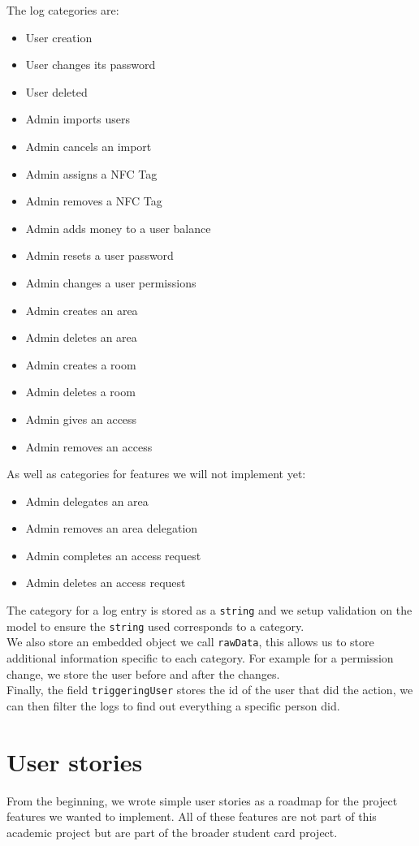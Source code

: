 \documentclass[11pt,a4paper]{report}
\begin{document}
The log categories are:
\begin{itemize}
\item User creation
\item User changes its password
\item User deleted
\item Admin imports users
\item Admin cancels an import
\item Admin assigns a NFC Tag
\item Admin removes a NFC Tag
\item Admin adds money to a user balance
\item Admin resets a user password
\item Admin changes a user permissions
\item Admin creates an area
\item Admin deletes an area
\item Admin creates a room
\item Admin deletes a room
\item Admin gives an access
\item Admin removes an access
\end{itemize}
As well as categories for features we will not implement yet:
\begin{itemize}
\item Admin delegates an area
\item Admin removes an area delegation
\item Admin completes an access request
\item Admin deletes an access request
\end{itemize}

The category for a log entry is stored as a \verb+string+ and we setup validation on the model to ensure the \verb+string+ used corresponds to a category.\\

We also store an embedded object we call \verb+rawData+, this allows us to store additional information specific to each category. For example for a permission change, we store the user before and after the changes. \\

Finally, the field \verb+triggeringUser+ stores the id of the user that did the action, we can then filter the logs to find out everything a specific person did.
\section{User stories}
From the beginning, we wrote simple user stories as a roadmap for the project features we wanted to implement. All of these features are not part of this academic project but are part of the broader student card project. 
\end{document}
